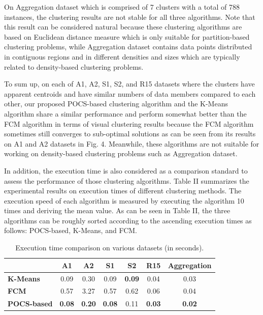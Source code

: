 \documentclass[conference]{IEEEtran}
\begin{document}
On Aggregation dataset which is comprised of 7 clusters with a total of 788 instances, the clustering results are not stable for all three algorithms. Note that this result can be considered natural because these clustering algorithms are based on Euclidean distance measure which is only suitable for partition-based clustering problems, while Aggregation dataset contains data points distributed in contiguous regions and in different densities and sizes which are typically related to density-based clustering problems.

To sum up, on each of A1, A2, S1, S2, and R15 datasets where the clusters have apparent centroids and have similar numbers of data members compared to each other, our proposed POCS-based clustering algorithm and the K-Means algorithm share a similar performance and perform somewhat better than the FCM algorithm in terms of visual clustering results because the FCM algorithm sometimes still converges to sub-optimal solutions as can be seen from its results on A1 and A2 datasets in Fig. 4. Meanwhile, these algorithms are not suitable for working on density-based clustering problems such as Aggregation dataset.


In addition, the execution time is also considered as a comparison standard to assess the performance of those clustering algorithms. Table II summarizes the experimental results on execution times of different clustering methods. The execution speed of each algorithm is measured by executing the algorithm 10 times and deriving the mean value. As can be seen in Table II, the three algorithms can be roughly sorted according to the ascending execution times as follows: POCS-based, K-Means, and FCM.


\begin{table}[t]
\caption{Execution time comparison on various datasets (in seconds).}
\setlength\tabcolsep{0pt} %
\begin{tabular*}{\columnwidth}{@{\extracolsep{\fill}} lcccccc}

\toprule
      & \textbf{A1} & \textbf{A2} & \textbf{S1} & \textbf{S2} & \textbf{R15} & \textbf{Aggregation}  \\

\midrule
     \textbf{K-Means} & 0.09 & 0.30 & 0.09 & \textbf{0.09} & 0.04 & 0.03   \\
     \textbf{FCM} & 0.57 & 3.27 & 0.57 & 0.62 & 0.06 & 0.04   \\
     \textbf{POCS-based} & \textbf{0.08} & \textbf{0.20} & \textbf{0.08} & 0.11 & \textbf{0.03} & \textbf{0.02}   \\

\bottomrule
\end{tabular*}
\end{table}
\end{document}
